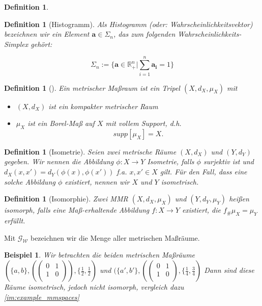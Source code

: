 \documentclass[11pt,a4paper]{article}
\def\emph#1{\textit{#1}}
\newtheorem{definition}[theorem]{Definition}
\newtheorem{example}[theorem]{Beispiel}
\numberwithin{equation}{section}
\begin{document}
	
	
	\begin{definition}
		
	\end{definition}
	
	\begin{definition}[Histogramm]
		Als Histogramm (oder: Wahrscheinlichkeitsvektor) bezeichnen wir ein Element $\boldsymbol{a} \in \Sigma_n$, das zum folgenden Wahrscheinlichkeits-Simplex gehört:
		
		\begin{equation*}
		\Sigma_n := \lbrace \boldsymbol{a} \in \mathbb{R}_{+}^n | \sum_{i=1}^n{\boldsymbol{a_i} = 1} \rbrace
		\end{equation*}
	\end{definition}


\begin{definition}[\cite{gromov2007metric}]
	Ein \emph{metrischer Maßraum} ist ein Tripel $(X,d_X,\mu_X)$ mit
	\begin{itemize}
		\item $(X, d_X)$ ist ein kompakter metrischer Raum
		\item $\mu_X$ ist ein Borel-Maß auf $X$ mit vollem Support, d.h. 
		\begin{equation}
			supp[\mu_X] = X.\label{eq:bed_mmspaces}
		\end{equation} 
	\end{itemize}
\end{definition}

\begin{definition}[Isometrie]
	Seien zwei metrische Räume $(X, d_X)$ und $(Y,d_Y)$ gegeben. Wir nennen die Abbildung $\phi:X \to Y$ Isometrie, falls $\phi$ surjektiv ist und $d_X(x,x')= d_Y(\phi(x),\phi(x'))$ f.a. $x, x' \in X$ gilt. Für den Fall, dass eine solche Abbildung $\phi$ existiert, nennen wir $X$ und $Y$ isometrisch.
\end{definition}

\begin{definition}[Isomorphie]
	Zwei MMR $(X,d_X,\mu_X)$ und $(Y,d_Y,\mu_Y)$ heißen isomorph, falls eine Maß-erhaltende Abbildung $f:X \to Y$ existiert, die $f_\#\mu_X = \mu_Y$ erfüllt.
\end{definition}

Mit $\mathcal{G}_\mathcal{W}$ bezeichnen wir die Menge aller metrischen Maßräume.

\begin{example}
	Wir betrachten die beiden metrischen Maßräume $(\lbrace a,b \rbrace, (\begin{pmatrix}
	0 & 1\\
	1 & 0 \\
	\end{pmatrix}), \lbrace \frac{1}{2},\frac{1}{2})$ und 
		$(\lbrace a',b' \rbrace, (
	\begin{pmatrix}
		0 & 1\\
		1 & 0 \\
	\end{pmatrix}, \lbrace \frac{1}{4},\frac{3}{4})$
	Dann sind diese Räume isometrisch, jedoch nicht isomorph, vergleich dazu \autoref{im:example_mmspaces}
\end{example}
\end{document}
